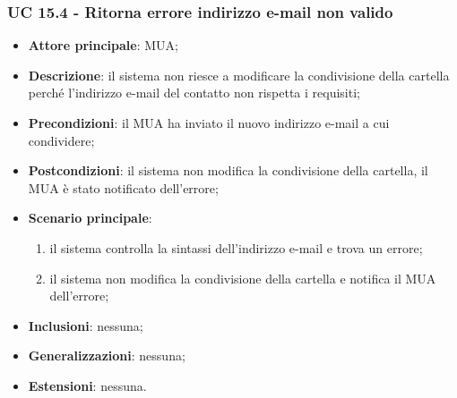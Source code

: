     \subsubsection{UC 15.4 - Ritorna errore indirizzo e-mail non valido} \label{sec:UC15.4}
    \begin{itemize}
        \item \textbf{Attore principale}: MUA;
        \item \textbf{Descrizione}: il sistema non riesce a modificare la condivisione della cartella perché l'indirizzo e-mail del contatto non rispetta i requisiti;
        \item \textbf{Precondizioni}: il MUA ha inviato il nuovo indirizzo e-mail a cui condividere;
        \item \textbf{Postcondizioni}: il sistema non modifica la condivisione della cartella, il MUA è stato notificato dell'errore;
        \item \textbf{Scenario principale}:
            \begin{enumerate}
                \item il sistema controlla la sintassi dell'indirizzo e-mail e trova un errore;
                \item il sistema non modifica la condivisione della cartella e notifica il MUA dell'errore;
            \end{enumerate}
        \item \textbf{Inclusioni}: nessuna;
        \item \textbf{Generalizzazioni}: nessuna;
        \item \textbf{Estensioni}: nessuna.
    \end{itemize}
